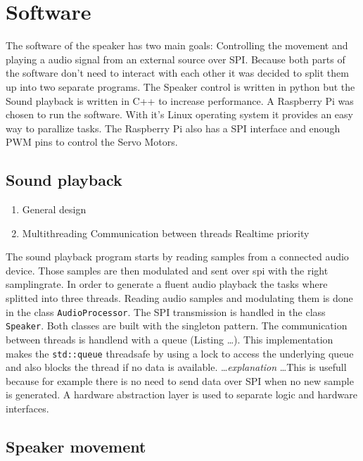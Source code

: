 \chapter{Software}

The software of the speaker has two main goals: Controlling the movement and playing a audio signal from an external source over SPI. Because both parts of the software don't need to interact with each other it was decided to split them up into two separate programs. The Speaker control is written in python but the Sound playback is written in C++ to increase performance.\p
%
A Raspberry Pi was chosen to run the software. With it's Linux operating system it provides an easy way to parallize tasks. The Raspberry Pi also has a SPI interface and enough PWM pins to control the Servo Motors.

\section{Sound playback}
\begin{enumerate}
  \item General design
  \item Multithreading
  \subitem Communication between threads
  \subitem Realtime priority
\end{enumerate}

The sound playback program starts by reading samples from a connected audio device. Those samples are then modulated and sent over spi with the right samplingrate. In order to generate a fluent audio playback the tasks where splitted into three threads.\p
Reading audio samples and modulating them is done in the class \lstinline{AudioProcessor}. The SPI transmission is handled in the class \lstinline{Speaker}. Both classes are built with the singleton pattern.
%
The communication between threads is handlend with a queue (Listing \dots). This implementation makes the \lstinline{std::queue} threadsafe by using a lock to access the underlying queue and also blocks the thread if no data is available. \dots \textit{explanation} \dots This is usefull because for example there is no need to send data over SPI when no new sample is generated.\p
%
A hardware abstraction layer is used to separate logic and hardware interfaces.





\section{Speaker movement}
